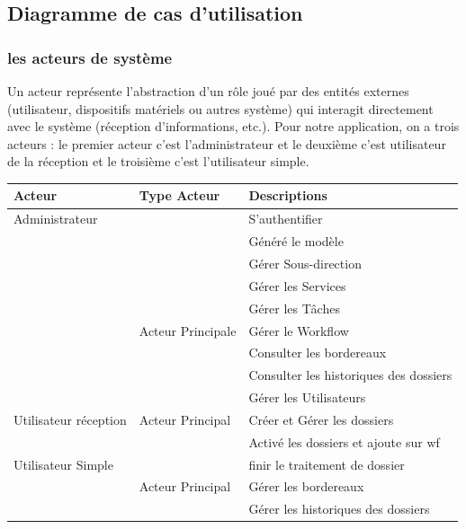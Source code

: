  
 
 
 
 
 
 
 
 
 
\subsection{ Diagramme de cas d’utilisation }
 
  \subsubsection{ les acteurs de système  }
 
Un acteur représente l'abstraction d'un rôle joué par des entités externes (utilisateur, dispositifs matériels ou autres système) qui interagit directement avec le système (réception d’informations, etc.). Pour notre application, on a trois acteurs : le premier acteur c'est l'administrateur et le deuxième c'est utilisateur de la réception et le troisième c'est l'utilisateur simple.
\begin{table}[H]
	\begin{tabular}{|l|l|l|}
		\hline
		\multicolumn{1}{|l|}{Acteur} & Type Acteur & Descriptions \\ \hline
	Administrateur	 &  & S’authentifier \\ \cline{3-3} 
		&  &Généré le modèle\\ \cline{3-3} 
		&  & Gérer Sous-direction \\ \cline{3-3} 
	 	&  & Gérer les Services \\ \cline{3-3} 	
	 	&  & Gérer les Tâches \\ \cline{3-3} 
 
		& Acteur Principale & Gérer   le Workflow   \\ \cline{3-3} 
				&  &Consulter les bordereaux   \\ \cline{3-3} 
						&  &Consulter les historiques des dossiers\\ \cline{3-3} 
								&  & Gérer les Utilisateurs \\ \hline 
		
  
			Utilisateur réception	 	&Acteur Principal & Créer et Gérer les dossiers  \\ \cline{3-3}  
		&  & Activé les dossiers et ajoute sur wf \\ \hline
 
		Utilisateur Simple	&  & finir le traitement de dossier  \\ \cline{3-3} 
		&  Acteur Principal& Gérer les bordereaux  \\ \cline{3-3} 
		&  &Gérer les historiques des dossiers\\ \hline 
	\end{tabular}
\end{table}
 

